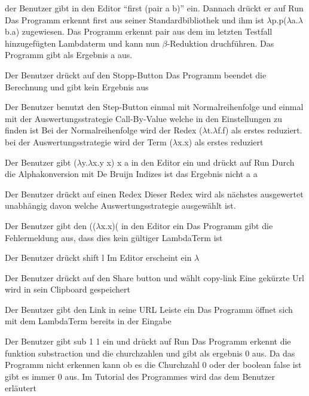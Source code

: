 \documentclass[parskip=full,11pt,twoside]{scrartcl}
\begin{document}
{ der Benutzer gibt in den Editor \enquote {first (pair a b)} ein. Dannach drückt er auf Run}
{ Das Programm erkennt first aus seiner Standardbibliothek und ihm ist $\lambda$p.p($\lambda$a.$\lambda$b.a) zugewiesen. Das Programm erkennt pair aus dem im letzten Testfall hinzugefügten Lambdaterm und kann nun $\beta$-Reduktion druchführen. Das Programm gibt als Ergebnis a aus.}

{Der Benutzer drückt auf den Stopp-Button}
{ Das Programm beendet die Berechnung und gibt kein Ergebnis aus }

{Der Benutzer benutzt den Step-Button einmal mit Normalreihenfolge  und einmal mit der Auswertungsstrategie Call-By-Value welche in den Einstellungen zu finden ist}
{ Bei der Normalreihenfolge wird der Redex ($\lambda$t.$\lambda$f.f) als erstes reduziert. bei der Auswertungsstrategie wird der Term ($\lambda$x.x) als erstes reduziert }

{ Der Benutzer gibt ($\lambda$y.$\lambda$x.y x) x a in den Editor ein und drückt auf Run}
{ Durch die Alphakonversion mit De Bruijn Indizes ist das Ergebnis nicht a  a  }

 { Der Benutzer drückt auf einen Redex}
{ Dieser Redex wird als nächstes ausgewertet unabhängig davon welche Auswertungsstrategie ausgewählt ist. }

{ Der Benutzer gibt den (($\lambda$x.x)( in den Editor ein }
{ Das Programm gibt die Fehlermeldung aus, dass dies kein gültiger LambdaTerm ist }

{ Der Benutzer drückt shift l }
{Im Editor erscheint ein $\lambda$}

{ Der Benutzer drückt auf den Share button und wählt copy-link}
{ Eine gekürzte Url wird in sein Clipboard gespeichert }

{Der Benutzer gibt den Link in seine URL Leiste ein }
{ Das Programm öffnet sich mit dem LambdaTerm bereits in der Eingabe }

{ Der Benutzer gibt sub 1 1 ein und drückt auf Run }
{ Das Programm erkennt die funktion substraction und die churchzahlen und gibt als ergebnis 0 aus. Da das Programm nicht erkennen kann ob es die Churchzahl 0 oder der boolean false ist gibt es immer 0 aus. Im Tutorial des Programmes wird das dem Benutzer erläutert }
\end{document}

